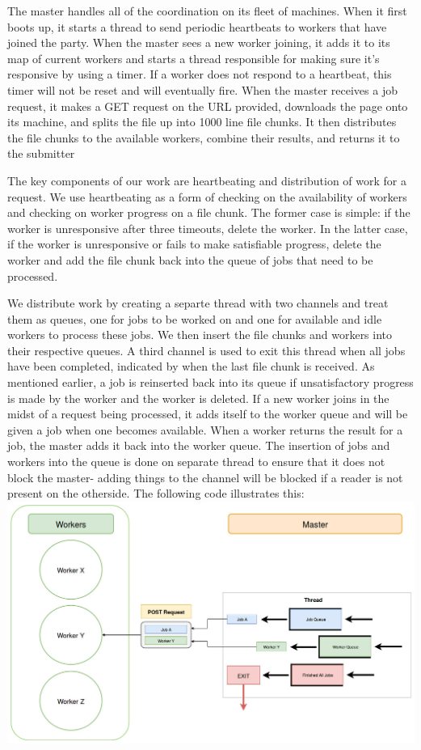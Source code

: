 \documentclass[twoside]{article}
\begin{document}
The master handles all of the coordination on its fleet of machines. When it first boots up, it starts a thread to send periodic heartbeats to workers that have joined the party. When the master sees a new worker joining, it adds it to its map of current workers and starts a thread responsible for making sure it's responsive by using a timer. If a worker does not respond to a heartbeat, this timer will not be reset and will eventually fire. When the master receives a job
request, it makes a GET request on the URL provided, downloads the page onto its machine, and splits the file up into 1000 line file chunks. It then distributes the file chunks to the available workers, combine their results, and returns it to the submitter

The key components of our work are heartbeating and distribution of work for a request. We use heartbeating as a form of checking on the availability of workers and checking on worker progress on a file chunk. The former case is simple: if the worker is unresponsive after three timeouts, delete the worker. In the latter case, if the worker is unresponsive or fails to make satisfiable progress, delete the worker and add the file chunk back into the queue of jobs that need to be processed. 

We distribute work by creating a separte thread with two channels and treat them as queues, one for jobs to be worked on and one for available and idle workers to process these jobs. We then insert the file chunks and workers into their respective queues. A third channel is used to exit this thread when all jobs have been completed, indicated by when the last file chunk is received. As mentioned earlier, a job is reinserted back into its queue if unsatisfactory progress is made by the worker and the worker is deleted. If a new worker joins in the midst of a request being processed, it adds itself to the worker queue and will
be given a job when one becomes available. When a worker returns the result for a job, the master adds it back into the worker queue. The insertion of jobs and workers into the queue is done on separate thread to ensure that it does not block the master- adding things to the channel will be blocked if a reader is not present on the otherside. The following code illustrates this: 
\includegraphics[width=\textwidth]{distribution}
\end{document}
